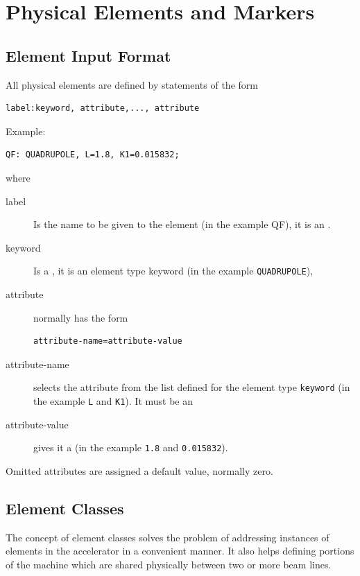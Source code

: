\chapter{Physical Elements and Markers}
\label{chp:element}

\section{Element Input Format}
\label{sec:elm-format}
All physical elements are defined by statements of the form
\begin{verbatim}
label:keyword, attribute,..., attribute
\end{verbatim}
\noindent Example:
\begin{verbatim}
QF: QUADRUPOLE, L=1.8, K1=0.015832;
\end{verbatim}
where
\begin{description}
\item[label]
  Is the name to be given to the element (in the example QF),
  it is an .
\item[keyword]
  Is a ,
  it is an element type keyword (in the example \texttt{QUADRUPOLE}),
\item[attribute]
  normally has the form
\begin{verbatim}
attribute-name=attribute-value
\end{verbatim}
\item[attribute-name]
  selects the attribute from the list defined for the element type 
  \texttt{keyword} (in the example \texttt{L} and \texttt{K1}).
  It must be an  
\item[attribute-value]
  gives it a  
  (in the example \texttt{1.8} and \texttt{0.015832}).
\end{description}
Omitted attributes are assigned a default value, normally zero.


\section{Element Classes}
\label{sec:elm-class}
The concept of element classes solves the problem of addressing
instances of elements in the accelerator in a convenient manner.
It also helps defining portions of the machine which are shared
physically between two or more beam lines.

